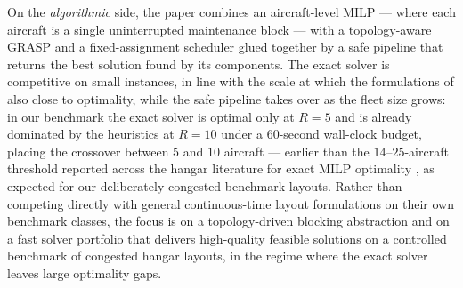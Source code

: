 On the \emph{algorithmic} side, the paper combines an aircraft-level
MILP --- where each aircraft is a single uninterrupted maintenance
block --- with a topology-aware GRASP and a fixed-assignment scheduler
glued together by a safe pipeline that returns the best solution found
by its components.  The exact solver is competitive on small
instances, in line with the scale at which the formulations of
\citet{Guepet2015, Shaukat2020, Pazhooh2025} also close to optimality,
while the safe pipeline takes over as the fleet size grows: in our
benchmark the exact solver is optimal only at $R = 5$ and is already
dominated by the heuristics at $R = 10$ under a 60-second wall-clock
budget, placing the crossover between $5$ and $10$ aircraft --- earlier
than the $14$--$25$-aircraft threshold reported across the hangar
literature for exact MILP optimality \citep{Pazhooh2025, Guepet2015,
Shaukat2020, Qin2019}, as expected for our deliberately congested
benchmark layouts.  Rather than competing directly with
general continuous-time layout formulations on their own benchmark
classes, the focus is on a topology-driven blocking abstraction and on
a fast solver portfolio that delivers high-quality feasible solutions
on a controlled benchmark of congested hangar layouts, in the regime
where the exact solver leaves large optimality gaps.
